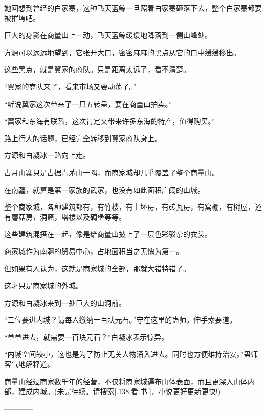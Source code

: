 \begin{this_body}
她回想到曾经的白家寨，这种飞天蓝鲸一旦照着白家寨砸落下去，整个白家寨都要被摧垮吧。

巨大的身影在商量山上一动，飞天蓝鲸缓缓地降落到一侧山峰处。

方源可以远远地望到，它张开大口，密密麻麻的黑点从它的口中缓缓移出。

这些黑点，就是翼家的商队。只是距离太远了，看不清楚。

“翼家的商队来了，看来市场又要动荡了。”

“听说翼家这次带来了一只五转蛊，要在商量山拍卖。”

“翼家和东海有联系，这次肯定又带来许多东海的特产，值得购买。”

路上行人的话题，已经完全转移到翼家商队身上。

方源和白凝冰一路向上走。

古月山寨只是占据青茅山一隅，而商家城却几乎覆盖了整个商量山。

在南疆，就算是第一家族的武家，也没有如此面积广阔的山城。

整个商家城，各种建筑都有，有竹楼，有土坯房，有砖瓦房，有窝棚，有树屋，还有蘑菇房，洞窟，塔楼以及碉堡等等。

这些建筑混搭在一起，像是给商量山披上了一层色彩驳杂的衣裳。

商家城作为南疆的贸易中心，占地面积当之无愧为第一。

但如果有人认为，这就是商家城的全部，那就大错特错了。

这才只是商家城的外城。

方源和白凝冰来到一处巨大的山洞前。

“二位要进内城？请每人缴纳一百块元石。”守在这里的蛊师，伸手索要道。

“单单进去，就需要一百块元石？”白凝冰表示惊异。

“内城空间较小，这也是为了防止无关人物涌入进去。同时也方便维持治安。”蛊师客气地解释道。

商量山经过商家数千年的经营，不仅将商家城遍布山体表面，而且更深入山体内部，建成内城。(未完待续。请搜索[.138.看.书.]，小说更好更新更快!)

------------

\end{this_body}

